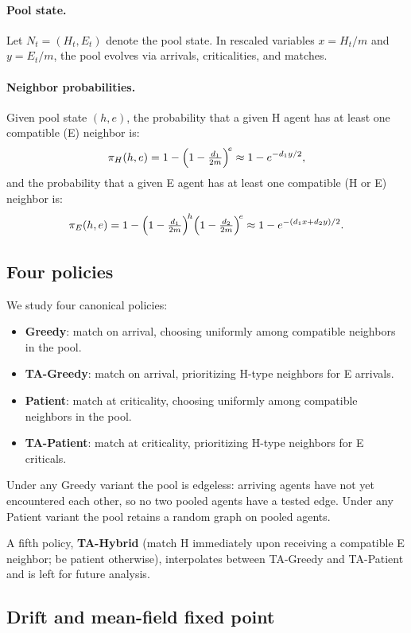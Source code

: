 \documentclass{article}
\theoremstyle{plain}
\theoremstyle{definition}
\begin{document}
\paragraph{Pool state.}
Let $N_t=(H_t,E_t)$ denote the pool state.  In rescaled variables
$x=H_t/m$ and $y=E_t/m$, the pool evolves via arrivals, criticalities, and
matches.

\paragraph{Neighbor probabilities.}
Given pool state $(h,e)$, the probability that a given H agent has at least
one compatible (E) neighbor is:
\[
  \pi_H(h,e)
    =1-\Bigl(1-\tfrac{d_1}{2m}\Bigr)^{\!e}
    \approx 1-e^{-d_1 y/2},
\]
and the probability that a given E agent has at least one compatible (H or E)
neighbor is:
\[
  \pi_E(h,e)
    =1-\Bigl(1-\tfrac{d_1}{2m}\Bigr)^{\!h}\Bigl(1-\tfrac{d_2}{2m}\Bigr)^{\!e}
    \approx 1-e^{-(d_1 x+d_2 y)/2}.
\]

\subsection{Four policies}
\label{sec:policies}

We study four canonical policies:
\begin{itemize}
\item \textbf{Greedy}: match on arrival, choosing uniformly among compatible
  neighbors in the pool.
\item \textbf{TA-Greedy}: match on arrival, prioritizing H-type neighbors for
  E arrivals.
\item \textbf{Patient}: match at criticality, choosing uniformly among
  compatible neighbors in the pool.
\item \textbf{TA-Patient}: match at criticality, prioritizing H-type neighbors
  for E criticals.
\end{itemize}
Under any Greedy variant the pool is edgeless: arriving agents have not yet
encountered each other, so no two pooled agents have a tested edge.  Under
any Patient variant the pool retains a random graph on pooled agents.

A fifth policy, \textbf{TA-Hybrid} (match H immediately upon receiving a
compatible E neighbor; be patient otherwise), interpolates between TA-Greedy
and TA-Patient and is left for future analysis.

\subsection{Drift and mean-field fixed point}
\end{document}
